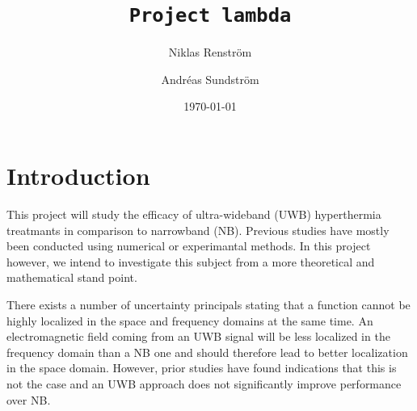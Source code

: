 \documentclass[11pt,a4paper, 
english, swedish %
]{article}
\begin{document}


%


\begin{titlepage}
\title{\tt Project lambda}
\author{Niklas Renström \and Andréas Sundström}
\date{\today}

\maketitle

\thispagestyle{empty} \pagestyle{empty} %

\begin{abstract} 


\end{abstract}
\newpage
\tableofcontents
\end{titlepage}

\setcounter{page}{1}


\section{Introduction}

This project will study the efficacy of ultra-wideband (UWB) hyperthermia treatmants in comparison to narrowband (NB). Previous studies have mostly been conducted using numerical or experimantal methods. In this project however, we intend to investigate this subject from a more theoretical and mathematical stand point. 

There exists a number of uncertainty  principals stating that a function cannot be highly localized in the space and frequency domains at the same time. An electromagnetic field coming from an UWB signal will be less localized in the frequency domain than a NB one and should therefore lead to better localization in the space domain. However, prior studies have found indications that this is not the case and an UWB approach does not significantly improve performance over NB.
\end{document}
